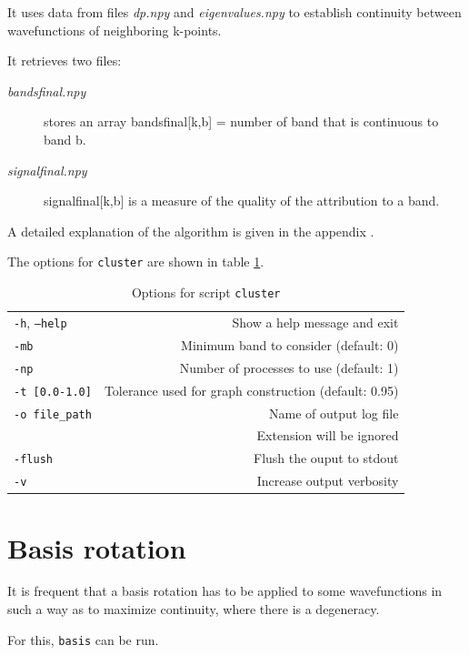 \documentclass[a4paper,12pt]{report}
\begin{document}
It uses data from files \emph{dp.npy} and \emph{eigenvalues.npy} to establish continuity
between wavefunctions of neighboring k-points.

 It retrieves two files:
 \begin{description}
   \item[\emph{bandsfinal.npy}] stores an array bandsfinal[k,b] = number of band that is continuous to band b.
   \item[\emph{signalfinal.npy}] signalfinal[k,b] is a measure of the quality of the attribution to a band.
 \end{description}

 A detailed explanation of the algorithm is given in the appendix .

 The options for \texttt{cluster} are shown in table \ref{tab:options_cluster}.

\begin{table}[h]
  \centering
  \caption{ Options for script \texttt{cluster}}\label{tab:options_cluster}
  \begin{tabular}[]{lr}
  \hline
  \texttt{-h}, \texttt{--help}  & Show a help message and exit \\
  \texttt{-mb}                  & Minimum band to consider (default: 0) \\
  \texttt{-np}                  & Number of processes to use (default: 1) \\
  \texttt{-t [0.0-1.0]}         & Tolerance used for graph construction (default: 0.95) \\
  \texttt{-o file\_path}        & Name of output log file\\
                                & Extension will be ignored \\
  \texttt{-flush}               & Flush the ouput to stdout \\
  \texttt{-v}                   & Increase output verbosity \\
  \hline
 \end{tabular}
 \end{table}



\section{Basis rotation}
 It is frequent that a basis rotation has to be applied to some wavefunctions in such a way
 as to maximize continuity, where there is a degeneracy.

 For this, \texttt{basis} can be run.
\end{document}
